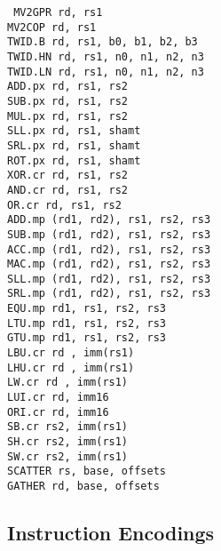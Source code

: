 {\tt
MV2GPR  rd, rs1                 \\
MV2COP  rd, rs1                 \\
TWID.B  rd, rs1, b0, b1, b2, b3 \\
TWID.HN rd, rs1, n0, n1, n2, n3 \\
TWID.LN rd, rs1, n0, n1, n2, n3 \\
ADD.px  rd, rs1, rs2            \\
SUB.px  rd, rs1, rs2            \\
MUL.px  rd, rs1, rs2            \\
SLL.px  rd, rs1, shamt          \\
SRL.px  rd, rs1, shamt          \\
ROT.px  rd, rs1, shamt          \\
XOR.cr  rd, rs1, rs2            \\
AND.cr  rd, rs1, rs2            \\
OR.cr   rd, rs1, rs2            \\
ADD.mp  (rd1, rd2),  rs1, rs2, rs3 \\
SUB.mp  (rd1, rd2),  rs1, rs2, rs3 \\
ACC.mp  (rd1, rd2),  rs1, rs2, rs3 \\
MAC.mp  (rd1, rd2),  rs1, rs2, rs3 \\
SLL.mp  (rd1, rd2),  rs1, rs2, rs3 \\
SRL.mp  (rd1, rd2),  rs1, rs2, rs3 \\
EQU.mp  rd1,         rs1, rs2, rs3 \\
LTU.mp  rd1,         rs1, rs2, rs3 \\
GTU.mp  rd1,         rs1, rs2, rs3 \\
LBU.cr  rd , imm(rs1)           \\
LHU.cr  rd , imm(rs1)           \\
LW.cr   rd , imm(rs1)           \\
LUI.cr  rd,  imm16              \\
ORI.cr  rd,  imm16              \\
SB.cr   rs2, imm(rs1)           \\
SH.cr   rs2, imm(rs1)           \\
SW.cr   rs2, imm(rs1)           \\
SCATTER rs, base, offsets       \\
GATHER  rd, base, offsets       \\
}

\newpage
\subsection{Instruction Encodings}

